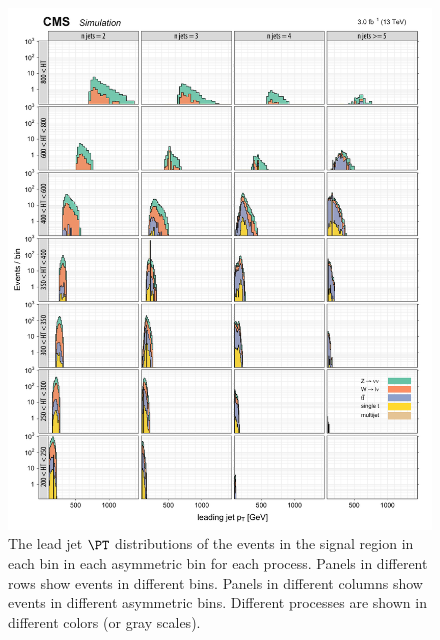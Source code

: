 \begin{figure}[!h]
\centering
\includegraphics[scale=0.95]{figures/kiplots/c150107_s150318_f015_jet_pt_0_40}
\caption{The lead jet $\PT$ distributions of the events in the signal
region in each \scalht bin in each asymmetric \njet bin for each
process. Panels in different rows show events in different \scalht
bins. Panels in different columns show events in different asymmetric
\njet bins. Different processes are shown in different colors (or gray
scales).} \label{c150107_s150318_f015_jet_pt_0_40}
\end{figure}

